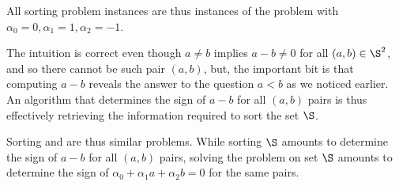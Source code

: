 All sorting problem instances are thus instances of the \twoLDT problem with
$\alpha_0 = 0, \alpha_1 = 1, \alpha_2 = -1$.

The intuition is correct even though $a \neq b$ implies $a-b \neq 0$ for all
$(a,b) \in \S^2$, and so there cannot be such pair $(a,b)$, but, the important
bit is that computing $a-b$ reveals the answer to the question $a<b$ as we
noticed earlier. An algorithm that determines the sign of $a-b$ for all $(a,b)$
pairs is thus effectively retrieving the information required to sort the set
$\S$.

Sorting and \twoLDT are thus similar problems. While sorting $\S$ amounts
to determine the sign of $a-b$ for all $(a,b)$ pairs, solving the \twoLDT
problem on set $\S$ amounts to determine the sign of $\alpha_0 + \alpha_1 a +
\alpha_2 b = 0$ for the same pairs.
